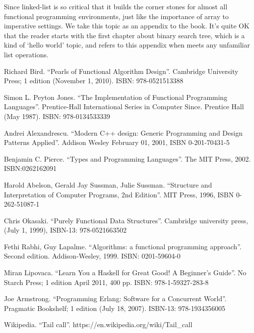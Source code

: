 \documentclass{article}
\begin{document}
Since linked-list is so critical that it builds the corner stones for almost all functional programming
environments, just like the importance of array to imperative settings. We take this topic as an appendix
to the book. It's quite OK that the reader starts with the first chapter about binary search tree, which
is a kind of `hello world' topic, and refers to this appendix when meets any unfamiliar list operations.


\begin{thebibliography}{99}

Richard Bird. ``Pearls of Functional Algorithm Design''. Cambridge University Press; 1 edition (November 1, 2010). ISBN: 978-0521513388

Simon L. Peyton Jones. ``The Implementation of Functional Programming Languages''. Prentice-Hall International Series in Computer Since. Prentice Hall (May 1987). ISBN: 978-0134533339

Andrei Alexandrescu. ``Modern C++ design: Generic Programming and Design Patterns Applied''. Addison Wesley February 01, 2001, ISBN 0-201-70431-5

Benjamin C. Pierce. ``Types and Programming Languages''. The MIT Press, 2002. ISBN:0262162091

Harold Abelson, Gerald Jay Sussman, Julie Sussman. ``Structure and Interpretation of Computer Programs, 2nd Edition''. MIT Press, 1996, ISBN 0-262-51087-1

Chris Okasaki. ``Purely Functional Data Structures''. Cambridge university press, (July 1, 1999), ISBN-13: 978-0521663502

Fethi Rabhi, Guy Lapalme. ``Algorithms: a functional programming approach''. Second edition. Addison-Wesley, 1999. ISBN: 0201-59604-0

Miran Lipovaca. ``Learn You a Haskell for Great Good! A Beginner's Guide''. No Starch Press; 1 edition April 2011, 400 pp. ISBN: 978-1-59327-283-8

Joe Armstrong. ``Programming Erlang: Software for a Concurrent World''. Pragmatic Bookshelf; 1 edition (July 18, 2007). ISBN-13: 978-1934356005

Wikipedia. ``Tail call''. https://en.wikipedia.org/wiki/Tail\_call


\end{thebibliography}
\end{document}
